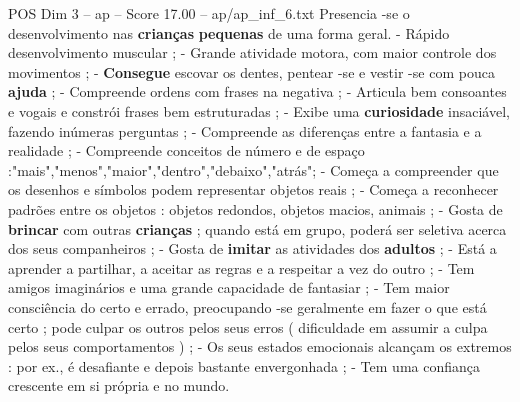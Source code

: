 \begin{textsample}{POS Dim 3 – ap – Score 17.00 – ap/ap\_inf\_6.txt}
Presencia -se o desenvolvimento nas \textbf{crianças} \textbf{pequenas} de uma forma geral. - Rápido desenvolvimento muscular ; - Grande atividade motora, com maior controle dos movimentos ; - \textbf{Consegue} escovar os dentes, pentear -se e vestir -se com pouca \textbf{ajuda} ; - Compreende ordens com frases na negativa ; - Articula bem consoantes e vogais e constrói frases bem estruturadas ; - Exibe uma \textbf{curiosidade} insaciável, fazendo inúmeras perguntas ; - Compreende as diferenças entre a fantasia e a realidade ; - Compreende conceitos de número e de espaço :"mais","menos","maior","dentro","debaixo","atrás"; - Começa a compreender que os desenhos e símbolos podem representar objetos reais ; - Começa a reconhecer padrões entre os objetos : objetos redondos, objetos macios, animais ; - Gosta de \textbf{brincar} com outras \textbf{crianças} ; quando está em grupo, poderá ser seletiva acerca dos seus companheiros ; - Gosta de \textbf{imitar} as atividades dos \textbf{adultos} ; - Está a aprender a partilhar, a aceitar as regras e a respeitar a vez do outro ; - Tem amigos imaginários e uma grande capacidade de fantasiar ; - Tem maior consciência do certo e errado, preocupando -se geralmente em fazer o que está certo ; pode culpar os outros pelos seus erros ( dificuldade em assumir a culpa pelos seus comportamentos ) ; - Os seus estados emocionais alcançam os extremos : por ex., é desafiante e depois bastante envergonhada ; - Tem uma confiança crescente em si própria e no mundo.

\end{textsample}
